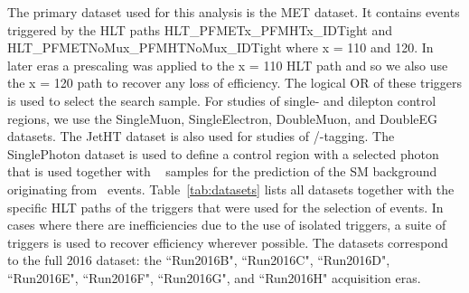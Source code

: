\label{sec:samples}
The primary dataset used for this analysis is the MET dataset.
It contains events triggered by the HLT paths HLT\_PFMETx\_PFMHTx\_IDTight and HLT\_PFMETNoMux\_PFMHTNoMux\_IDTight where x = 110 and 120. In later eras a prescaling was applied to the x = 110 HLT path and so we also use the x = 120 path to recover any loss of efficiency. The logical OR of these triggers is used to select the search sample. 
 For studies of single- and dilepton control regions, we use the SingleMuon, SingleElectron, DoubleMuon, and DoubleEG datasets. The JetHT dataset is also used for studies of \W/\topq-tagging. The SinglePhoton dataset is used to define a control region with a selected photon that is used together with \zll~  samples for the prediction of the SM background originating from \znunu~events. Table~\ref{tab:datasets} lists all datasets together with the specific HLT paths of the triggers that were used for the selection of events. In cases where there are inefficiencies due to the use of isolated triggers, a suite of triggers is used to recover efficiency wherever possible. The datasets correspond to the full 2016 dataset: the ``Run2016B", ``Run2016C", ``Run2016D", ``Run2016E", ``Run2016F", ``Run2016G", and ``Run2016H" acquisition eras.

